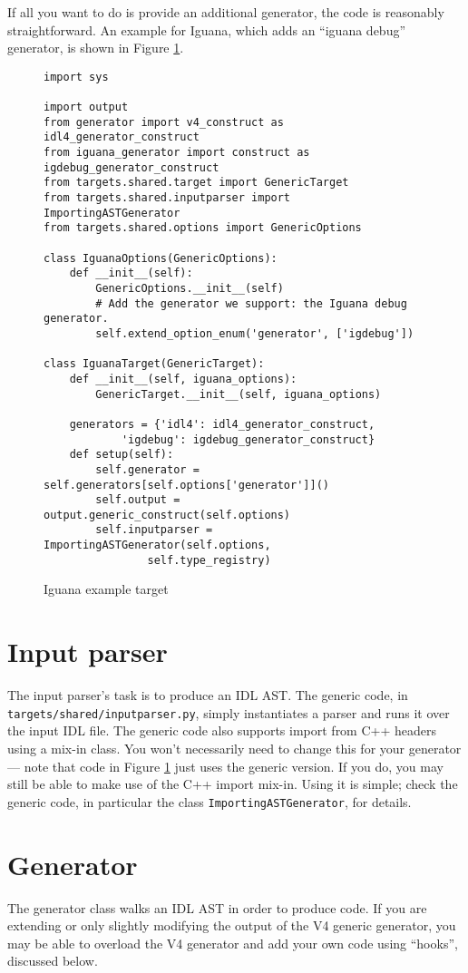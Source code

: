 If all you want to do is provide an additional generator, the code is reasonably straightforward. An example for Iguana, which adds an ``iguana debug'' generator, is shown in Figure \ref{fig:code:iguanatarget}.
\begin{figure}
\begin{verbatim}
import sys

import output
from generator import v4_construct as idl4_generator_construct
from iguana_generator import construct as igdebug_generator_construct
from targets.shared.target import GenericTarget
from targets.shared.inputparser import ImportingASTGenerator
from targets.shared.options import GenericOptions

class IguanaOptions(GenericOptions):
    def __init__(self):
        GenericOptions.__init__(self)
        # Add the generator we support: the Iguana debug generator.
        self.extend_option_enum('generator', ['igdebug'])

class IguanaTarget(GenericTarget):
    def __init__(self, iguana_options):
        GenericTarget.__init__(self, iguana_options)

    generators = {'idl4': idl4_generator_construct,
            'igdebug': igdebug_generator_construct}
    def setup(self):
        self.generator = self.generators[self.options['generator']]()
        self.output = output.generic_construct(self.options)
        self.inputparser = ImportingASTGenerator(self.options,
				self.type_registry)
\end{verbatim}
\caption{Iguana example target}
\label{fig:code:iguanatarget}
\end{figure}

\section{Input parser}
The input parser's task is to produce an IDL AST. The generic code, in {\tt targets/shared/inputparser.py}, simply instantiates a parser and runs it over the input IDL file. The generic code also supports import from C++ headers using a mix-in class. You won't necessarily need to change this for your generator --- note that code in Figure \ref{fig:code:iguanatarget} just uses the generic version. If you do, you may still be able to make use of the C++ import mix-in. Using it is simple; check the generic code, in particular the class {\tt ImportingASTGenerator}, for details.

\section{Generator}
The generator class walks an IDL AST in order to produce code. If you are extending or only slightly modifying the output of the V4 generic generator, you may be able to overload the V4 generator and add your own code using ``hooks'', discussed below.

